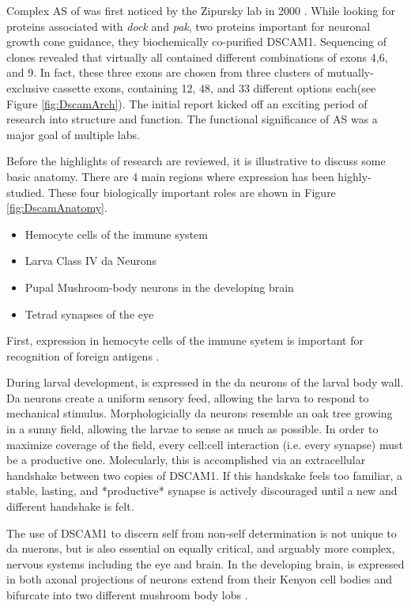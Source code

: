     Complex AS of\dscam{} was first noticed by the Zipursky lab in 2000 \citep{Schmucker2000}. While looking for proteins associated with \textit{dock} and \textit{pak}, two proteins important for neuronal growth cone guidance, they biochemically co-purified DSCAM1. Sequencing of \dscam{} clones revealed that virtually all contained different combinations of exons 4,6, and 9. In fact, these three exons are chosen from three clusters of mutually-exclusive cassette exons, containing 12, 48, and 33 different options each(see Figure \ref{fig:DscamArch}). The initial report kicked off an exciting period of research into \dscam{} structure and function. The functional significance of \dscam{} AS was a major goal of multiple labs.

    Before the highlights of \dscam{} research are reviewed, it is illustrative to discuss some basic \flies{} anatomy. There are 4 main regions where \dscam{} expression has been highly-studied. These four biologically important roles are shown in Figure \ref{fig:DscamAnatomy}.

    \begin{itemize} \itemsep0.5pt \parskip0pt  %
      \item Hemocyte cells of the immune system
      \item Larva Class IV da Neurons 
      \item Pupal Mushroom-body neurons in the developing brain
      \item Tetrad synapses of the eye
      \end{itemize}

    First, \dscam{} expression in hemocyte cells of the immune system is important for recognition of foreign antigens \citep{Watson2005}. 

    During larval development, \dscam{} is expressed in the da neurons of the larval body wall. Da neurons create a uniform sensory feed, allowing the larva to respond to mechanical stimulus. Morphologicially da neurons resemble an oak tree growing in a sunny field, allowing the larvae to sense as much as possible. In order to maximize coverage of the field, every cell:cell interaction (i.e. every synapse) must be a productive one. Molecularly, this is accomplished via an extracellular handshake between two copies of DSCAM1. If this handskake feels too familiar, a stable, lasting, and *productive* synapse is actively discouraged until a new and different handshake is felt. 

    The use of DSCAM1 to discern self from non-self determination is not unique to da nuerons, but is also essential on equally critical, and arguably more complex, nervous systems including the eye and brain. In the developing brain, \dscam{} is expressed in both axonal projections of neurons extend from their Kenyon cell bodies and bifurcate into two different mushroom body lobs \citep{Zhan2004}. 

